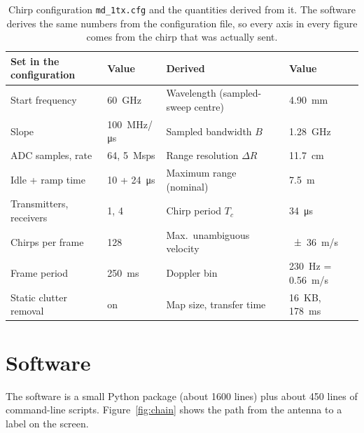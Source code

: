 \documentclass[11pt,a4paper]{article}
\begin{document}
\begin{table}[h]
\centering\small
\caption{Chirp configuration \texttt{md\_1tx.cfg} and the quantities derived from it. The software derives the same numbers from the configuration file, so every axis in every figure comes from the chirp that was actually sent.}
\label{tab:chirp}
\begin{tabular}{@{}llll@{}}
\toprule
Set in the configuration & Value & Derived & Value \\
\midrule
Start frequency & \SI{60}{GHz} & Wavelength (sampled-sweep centre) & \SI{4.90}{mm}\\
Slope & \SI{100}{MHz/\micro s} & Sampled bandwidth $B$ & \SI{1.28}{GHz}\\
ADC samples, rate & 64, \SI{5}{Msps} & Range resolution $\Delta R$ & \SI{11.7}{cm}\\
Idle + ramp time & \SI{10}{} + \SI{24}{\micro s} & Maximum range (nominal) & \SI{7.5}{m}\\
Transmitters, receivers & 1, 4 & Chirp period $T_c$ & \SI{34}{\micro s}\\
Chirps per frame & 128 & Max.\ unambiguous velocity & \SI{\pm 36}{m/s}\\
Frame period & \SI{250}{ms} & Doppler bin & \SI{230}{Hz} = \SI{0.56}{m/s}\\
Static clutter removal & on & Map size, transfer time & \SI{16}{KB}, \SI{178}{ms}\\
\bottomrule
\end{tabular}
\end{table}

\section{Software}\label{sec:software}

The software is a small Python package (about 1600 lines) plus about 450 lines of command-line scripts. Figure~\ref{fig:chain} shows the path from the antenna to a label on the screen.
\end{document}
